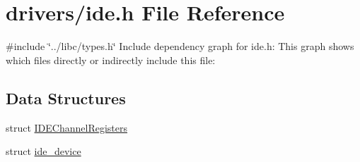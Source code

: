 \hypertarget{a00026}{}\section{drivers/ide.h File Reference}
\label{a00026}
{\ttfamily \#include \char`\"{}../libc/types.\+h\char`\"{}}\newline
Include dependency graph for ide.\+h\+:
This graph shows which files directly or indirectly include this file\+:
\subsection*{Data Structures}
\begin{DoxyCompactItemize}
\item 
struct \hyperlink{a00174}{I\+D\+E\+Channel\+Registers}
\item 
struct \hyperlink{a00178}{ide\+\_\+device}
\end{DoxyCompactItemize}
